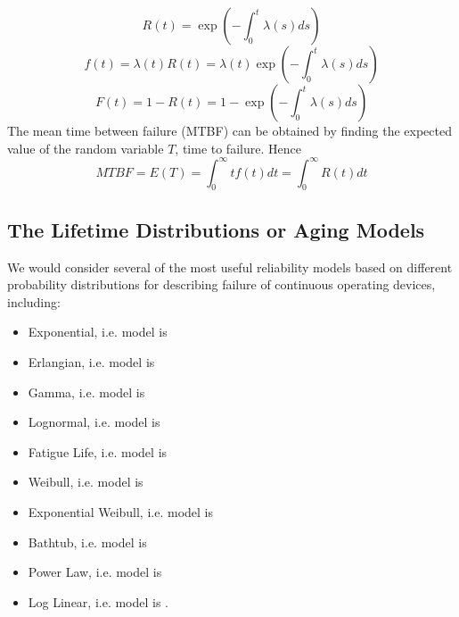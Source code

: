 \begin{equation}
  R(t) = \exp(-\int_{0}^{t} \lambda (s)ds)
\end{equation}
\begin{equation}
	f(t) = \lambda (t)R(t) = \lambda (t)\exp(-\int_{0}^{t} \lambda (s)ds)
\end{equation}
\begin{equation}
 	F(t) = 1 - R(t) = 1 - \exp(-\int_{0}^{t} \lambda (s)ds)
\end{equation}
The mean time between failure (MTBF) can be obtained by finding the expected value of the random variable
$T$, time to failure. Hence
\begin{equation}
  MTBF = E(T) = \int_{0}^{\infty} tf(t)dt = \int_{0}^{\infty} R(t)dt
\end{equation}

\subsection{The Lifetime Distributions or Aging Models}
We would consider several of the most useful reliability models based on different probability
distributions for describing failure of continuous operating devices, including:
\begin{itemize}
	\item Exponential, i.e. model  is 
	\item Erlangian, i.e. model  is 
	\item Gamma, i.e. model  is 
	\item Lognormal, i.e. model  is 
	\item Fatigue Life, i.e. model  is 
	\item Weibull, i.e. model  is 
	\item Exponential Weibull, i.e. model  is 
	\item Bathtub, i.e. model  is 
	\item Power Law, i.e. model  is 
	\item Log Linear, i.e. model  is .
\end{itemize}

